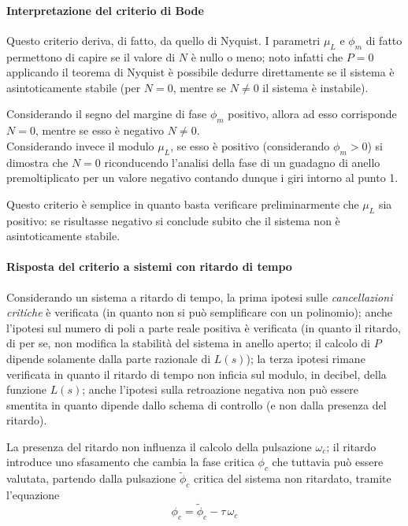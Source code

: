 		\paragraph{Interpretazione del criterio di Bode} Questo criterio deriva, di fatto, da quello di Nyquist. I parametri $\mu_L$ e $\phi_m$ di fatto permettono di capire se il valore di $N$ è nullo o meno; noto infatti che $P=0$ applicando il teorema di Nyquist è possibile dedurre direttamente se il sistema è asintoticamente stabile (per $N=0$, mentre se $N\neq 0$ il sistema è instabile).
		
		Considerando il segno del margine di fase $\phi_m$ positivo, allora ad esso corrisponde $N =0$, mentre se esso è negativo $N\neq 0$. \\ Considerando invece il modulo $\mu_L$, se esso è positivo (considerando $\phi_m>0$) si dimostra che $N=0$ riconducendo l'analisi della fase di un guadagno di anello premoltiplicato per un valore negativo contando dunque i giri intorno al punto 1.
		
		Questo criterio è semplice in quanto basta verificare preliminarmente che $\mu_L$ sia positivo: se risultasse negativo si conclude subito che il sistema non è asintoticamente stabile.
		
		\paragraph{Risposta del criterio a sistemi con ritardo di tempo} Considerando un sistema a ritardo di tempo, la prima ipotesi sulle \textit{cancellazioni critiche} è verificata (in quanto non si può semplificare con un polinomio); anche l'ipotesi sul numero di poli a parte reale positiva è verificata (in quanto il ritardo, di per se, non modifica la stabilità del sistema in anello aperto; il calcolo di $P$ dipende solamente dalla parte razionale di $L(s)$); la terza ipotesi rimane verificata in quanto il ritardo di tempo non inficia sul modulo, in decibel, della funzione $L(s)$; anche l'ipotesi sulla retroazione negativa non può essere smentita in quanto dipende dallo schema di controllo (e non dalla presenza del ritardo).
		
		La presenza del ritardo non influenza il calcolo della pulsazione $\omega_c$; il ritardo introduce uno sfasamento che cambia la fase critica $\phi_c$ che tuttavia può essere valutata, partendo dalla pulsazione $\tilde \phi_c$ critica del sistema non ritardato, tramite l'equazione
		\[ \phi_c = \tilde \phi_c - \tau\, \omega_c  \] 
		
